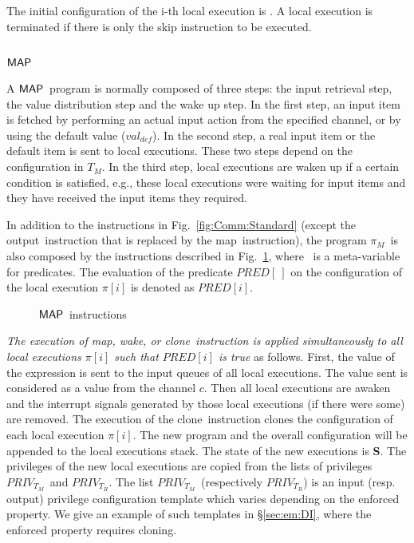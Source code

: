 \documentclass[10pt,a4paper,oneside]{article}
\def\ProgM{\ensuremath{\Prog_{M}}}
\def\sS{\textbf{S}}
\def\TAV{\ensuremath{T_{M}}}
\def\chnl{\ensuremath{c}}
\def\sanserif#1{\ensuremath{\sf #1}}
\def\MAP{\ensuremath{\sanserif{MAP}}}
\def\defVal{\ensuremath{val_{def}}}
\def\Prog{\ensuremath{\pi}}
\def\Progl#1{\ensuremath{\Prog[#1]}}
\def\NOUTPUT{output}
\def\NMAP{map}
\def\NCLONE{clone}
\def\NWAKE{wake}
\def\NPRED{\ensuremath{PRED}}
\def\PREDE#1{\ensuremath{\NPRED[#1]}}
\def\tcolm{\ensuremath{PRIV_{T_M}}}
\def\tcolr{\ensuremath{PRIV_{T_R}}}
\begin{document}
The initial configuration of the i-th local execution is .
A local execution is terminated if there is only the skip instruction to be executed.

\subsection{\MAP}
A \MAP\ program is normally composed of three steps: the input retrieval step, the value distribution step and the wake up step. In the first step, an input item is fetched by performing an actual input action from the specified channel, or by using the default value (\defVal). In the second step, a real input item or the default item is sent to local executions. These two steps depend on the configuration in \TAV. In the third step, local executions are waken up if a certain condition is satisfied, e.g., these local executions were waiting for input items and they have received the input items they required.

In addition to the instructions in Fig.~\ref{fig:Comm:Standard} (except the \NOUTPUT\ instruction that is replaced by the \NMAP\ instruction), the program \ProgM\ is also composed by the instructions described in Fig.~\ref{fig:Comm:MAP}, where \ is a meta-variable for predicates. The evaluation of the predicate \PREDE{\ } on the configuration of the local execution \Progl{i} is denoted as \PREDE{i}.

\begin{figure}
\begin{center}

\vspace{-10pt}
\caption{\MAP\ instructions}
\label{fig:Comm:MAP}
\end{center}
\end{figure}


\emph{The execution of \NMAP, \NWAKE, or \NCLONE\ instruction is applied simultaneously to all local executions \Progl{i} such that \PREDE{i} is true} as follows. First, the value of the expression  is sent to the input queues of all local executions. The value sent is considered as a value from the channel \chnl. Then all local executions  are awaken and the interrupt signals generated by those local executions (if there were some) are removed. The execution of the \NCLONE\ instruction clones the configuration of each local execution \Progl{i}. The new program and the overall configuration will be appended to the local executions stack. The state of the new executions is \sS. The privileges of the new local executions are copied from the lists of privileges \tcolm\ and \tcolr. The list \tcolm\ (respectively \tcolr) is an input (resp. output) privilege configuration template which varies depending on the enforced property. We give an example of such templates in \S\ref{sec:em:DI}, where the enforced property requires cloning.
\end{document}
